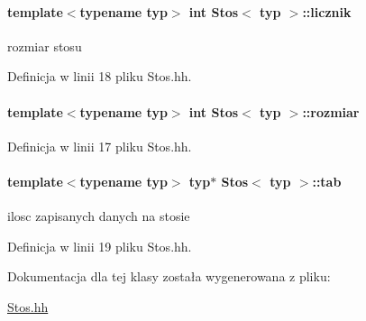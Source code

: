 \paragraph[{licznik}]{\setlength{\rightskip}{0pt plus 5cm}template$<$typename typ$>$ int {\bf Stos}$<$ typ $>$\+::licznik\hspace{0.3cm}{\ttfamily [private]}}\label{class_stos_a6c59f21dc384c9dfdbae5343446c704f}
rozmiar stosu 

Definicja w linii 18 pliku Stos.\+hh.

\hypertarget{class_stos_a66c92dc47edd280d9ea15fbcafcd9a80}{}
\paragraph[{rozmiar}]{\setlength{\rightskip}{0pt plus 5cm}template$<$typename typ$>$ int {\bf Stos}$<$ typ $>$\+::rozmiar\hspace{0.3cm}{\ttfamily [private]}}\label{class_stos_a66c92dc47edd280d9ea15fbcafcd9a80}


Definicja w linii 17 pliku Stos.\+hh.

\hypertarget{class_stos_acb9c6baeb0616796d20cfd05f6457fe3}{}
\paragraph[{tab}]{\setlength{\rightskip}{0pt plus 5cm}template$<$typename typ$>$ typ$\ast$ {\bf Stos}$<$ typ $>$\+::tab\hspace{0.3cm}{\ttfamily [private]}}\label{class_stos_acb9c6baeb0616796d20cfd05f6457fe3}
ilosc zapisanych danych na stosie 

Definicja w linii 19 pliku Stos.\+hh.



Dokumentacja dla tej klasy została wygenerowana z pliku\+:\begin{DoxyCompactItemize}
\item 
\hyperlink{_stos_8hh}{Stos.\+hh}\end{DoxyCompactItemize}
